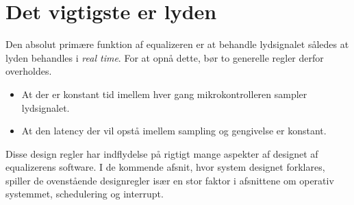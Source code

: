 \section{Det vigtigste er lyden}
Den absolut primære funktion af equalizeren er at behandle lydsignalet således at lyden behandles i \textit{real time}.
For at opnå dette, bør to generelle regler derfor overholdes.
\begin{itemize}[noitemsep]
\item At der er konstant tid imellem hver gang mikrokontrolleren sampler lydsignalet.
\item At den latency der vil opstå imellem sampling og gengivelse er konstant.
\end{itemize}

Disse design regler har indflydelse på rigtigt mange aspekter af designet af equalizerens software.
I de kommende afsnit, hvor system designet forklares, spiller de ovenstående designregler især en stor faktor i afsnittene om operativ systemmet, schedulering og interrupt.
